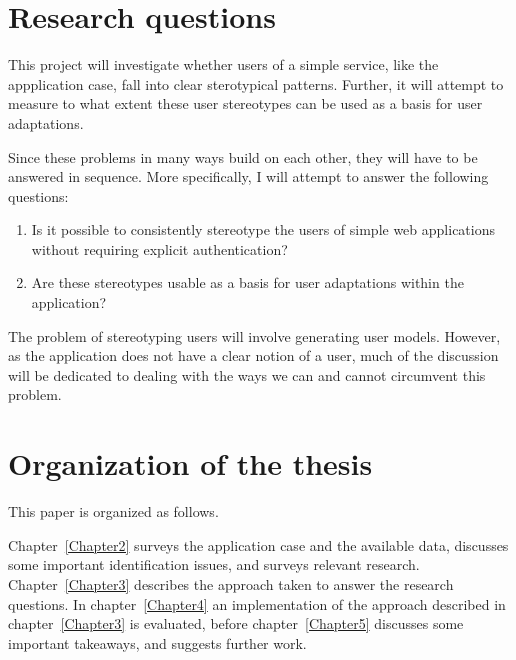 
\section{Research questions}
\label{intro:research_questions}

  This project will investigate whether users of a simple service, like the appplication case, fall into clear sterotypical patterns. Further, it will attempt to measure to what extent these user stereotypes can be used as a basis for user adaptations.

  Since these problems in many ways build on each other, they will have to be answered in sequence. More specifically, I will attempt to answer the following questions:

  \begin{enumerate}
    \item Is it possible to consistently stereotype the users of simple web applications without requiring explicit authentication?
    \item Are these stereotypes usable as a basis for user adaptations within the application?
  \end{enumerate}

  The problem of stereotyping users will involve generating user models. However, as the application does not have a clear notion of a user, much of the discussion will be dedicated to dealing with the ways we can and cannot circumvent this problem.

\section{Organization of the thesis}
\label{intro:thesis_organization}

  This paper is organized as follows.

  Chapter~\ref{Chapter2} surveys the application case and the available data, discusses some important identification issues, and surveys relevant research.
  Chapter~\ref{Chapter3} describes the approach taken to answer the research questions.
  In chapter~\ref{Chapter4} an implementation of the approach described in chapter~\ref{Chapter3} is evaluated, before chapter~\ref{Chapter5} discusses some important takeaways, and suggests further work.
